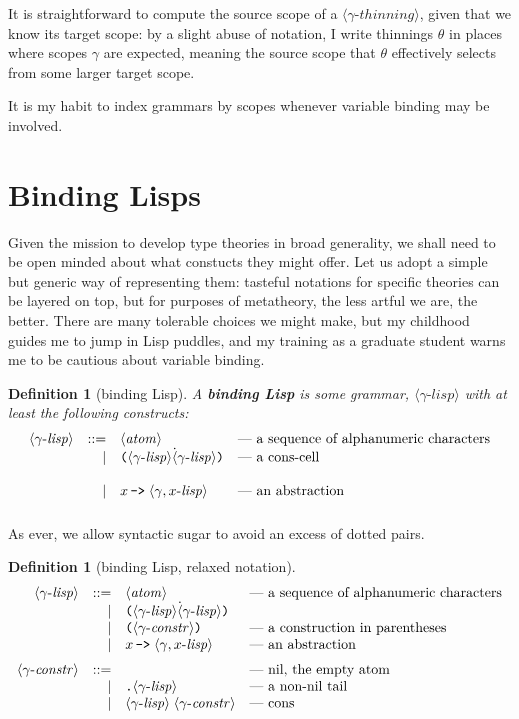 \documentclass{jfp1}
\newtheorem{definition}[theorem]{Definition}
\newcommand{\ab}{\,\texttt{->}\;}
\newcommand{\Pa}[1]{\texttt{(}#1\texttt{)}}
\newcommand{\D}{\texttt{.}}
\newcommand{\SC}[1]{\langle\mathit{#1}\rangle}
\newcommand{\GS}[2]{\langle#1\textrm{-}\mathit{#2}\rangle}
\newcommand{\ths}{}
\begin{document}
It is straightforward to compute the source scope of a $\GS\gamma{thinning}$, given that we know its target scope: by a slight abuse of notation, I write
thinnings $\ths\theta$ in places where scopes $\gamma$ are expected, meaning the source scope that $\theta$ effectively selects from some larger target scope.

It is my habit to index grammars by scopes whenever variable binding may be involved.


\section{Binding Lisps}

Given the mission to develop type theories in broad generality, we shall need
to be open minded about what constucts they might offer. Let us adopt a
simple but generic way of representing them: tasteful notations for specific
theories can be layered on top, but for purposes of metatheory, the less
artful we are, the better. There are many tolerable choices we might make, but my
childhood guides me to jump in Lisp puddles, and my
training as a graduate student warns me to be cautious about variable binding.

\begin{definition}[binding Lisp]
  A \textbf{binding Lisp} is some grammar, $\GS\gamma{lisp}$ with at least the following constructs:
  \[\begin{array}{rrll}
      \GS\gamma{lisp} & ::= & \SC{atom} & \mbox{--- a sequence of alphanumeric characters} \\
                &   | & \Pa{\GS\gamma{lisp}\dot\GS\gamma{lisp}} & \mbox{--- a cons-cell} \\\\
                &   | & x \ab \GS{\gamma,x}{lisp} & \mbox{--- an abstraction} \medskip\\
  \end{array}\]
\end{definition}

As ever, we allow syntactic sugar to avoid an excess of dotted pairs.

\begin{definition}[binding Lisp, relaxed notation]
  \[\begin{array}{rrll}
      \GS\gamma{lisp} & ::= & \SC{atom} & \mbox{--- a sequence of alphanumeric characters} \\
                &   | & \Pa{\GS\gamma{lisp}\dot\GS\gamma{lisp}} \\
                &   | & \Pa{\GS\gamma{constr}} & \mbox{--- a construction in parentheses} \\
                &   | & x \ab \GS{\gamma,x}{lisp} & \mbox{--- an abstraction} \medskip\\
      \GS\gamma{constr} & ::= &  & \mbox{--- nil, the empty atom}\\
                &   | & \D \GS\gamma{lisp} & \mbox{--- a non-nil tail} \\
                &   | & \GS\gamma{lisp}\; \GS\gamma{constr} & \mbox{--- cons} \\
  \end{array}\]
\end{definition}
\end{document}
